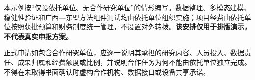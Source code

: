 \GXNSFBodyText

本示例按“仅设依托单位、无合作研究单位”的情形编写。数据整理、多模态建模、稳健性验证和广西—东盟方法组件测试均由依托单位组织实施；项目经费由依托单位按照获批预算和财务制度统一管理，不设置对外转拨。\textbf{该安排仅用于排版演示，不代表真实申报方案。}

正式申请如包含合作研究单位，应逐一说明其承担的研究内容、人员投入、数据责任、成果归属和经费额度或比例，并说明合作任务为何不能由依托单位独立完成。不得在未取得书面确认时虚构合作机构、数据接口或设备共享承诺。
